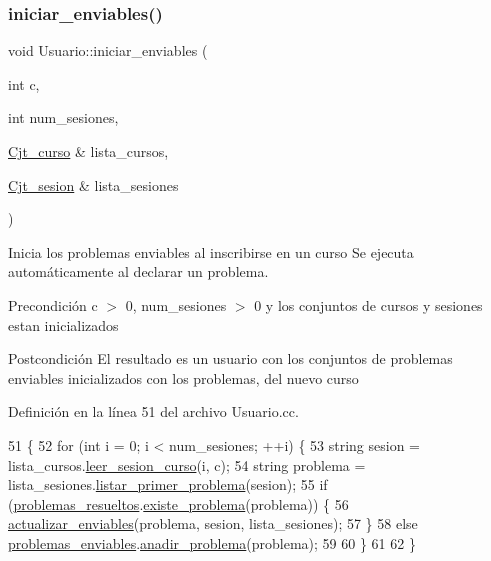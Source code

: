 \subsubsection{\texorpdfstring{iniciar\+\_\+enviables()}{iniciar\_enviables()}}
{\footnotesize\ttfamily void Usuario\+::iniciar\+\_\+enviables (\begin{DoxyParamCaption}\item[{int}]{c,  }\item[{int}]{num\+\_\+sesiones,  }\item[{\mbox{\hyperlink{class_cjt__curso}{Cjt\+\_\+curso}} \&}]{lista\+\_\+cursos,  }\item[{\mbox{\hyperlink{class_cjt__sesion}{Cjt\+\_\+sesion}} \&}]{lista\+\_\+sesiones }\end{DoxyParamCaption})\hspace{0.3cm}{\ttfamily [private]}}



Inicia los problemas enviables al inscribirse en un curso Se ejecuta automáticamente al declarar un problema. 

\begin{DoxyPrecond}{Precondición}
c $>$ 0, num\+\_\+sesiones $>$ 0 y los conjuntos de cursos y sesiones estan inicializados 
\end{DoxyPrecond}
\begin{DoxyPostcond}{Postcondición}
El resultado es un usuario con los conjuntos de problemas enviables inicializados con los problemas, del nuevo curso 
\end{DoxyPostcond}


Definición en la línea 51 del archivo Usuario.\+cc.


\begin{DoxyCode}
51                                                                                                            
       \{
52   \textcolor{keywordflow}{for} (\textcolor{keywordtype}{int} i = 0; i < num\_sesiones; ++i) \{
53       \textcolor{keywordtype}{string} sesion = lista\_cursos.\mbox{\hyperlink{class_cjt__curso_a62fcf92bed669fed99ef01f495570877}{leer\_sesion\_curso}}(i, c);
54       \textcolor{keywordtype}{string} problema = lista\_sesiones.\mbox{\hyperlink{class_cjt__sesion_aade2be6a90f0135b38342f877cc26ae6}{listar\_primer\_problema}}(sesion);
55       \textcolor{keywordflow}{if} (\mbox{\hyperlink{class_usuario_a53fa260ffc780dd5c3a4805d683e5ee7}{problemas\_resueltos}}.\mbox{\hyperlink{class_cjt__problema_a831be5b51e252520ee981b58d9ec00e9}{existe\_problema}}(problema)) \{
56         \mbox{\hyperlink{class_usuario_a4dbe4aafe7c5308293ef5f6094f35bb1}{actualizar\_enviables}}(problema, sesion, lista\_sesiones);
57       \}
58       \textcolor{keywordflow}{else} \mbox{\hyperlink{class_usuario_a553cef1aad192b30d010cd524f261c1b}{problemas\_enviables}}.\mbox{\hyperlink{class_cjt__problema_a6086147f5615c1cf42d6d563682b080d}{anadir\_problema}}(problema);
59 
60   \}
61 
62 \}
\end{DoxyCode}
\mbox{\label{class_usuario_a4dbe4aafe7c5308293ef5f6094f35bb1}} 
